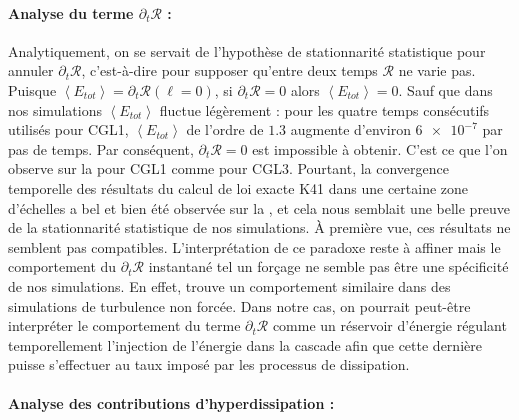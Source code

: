 \paragraph{Analyse du terme $\partial_t \mathcal{R}$ :  } 
 Analytiquement, on se servait de l'hypothèse de stationnarité statistique pour annuler $\partial_t \mathcal{R}$, c'est-à-dire pour supposer qu'entre deux temps $\mathcal{R}$ ne varie pas. Puisque $\left<E_{tot}\right>=\partial_t \mathcal{R}(\boldsymbol{\ell} = 0)$, si $\partial_t \mathcal{R}=0$ alors $\left<E_{tot}\right>=0$.  Sauf que dans nos simulations $\left<E_{tot}\right>$ fluctue légèrement : pour les quatre temps consécutifs utilisés pour CGL1, $\left<E_{tot}\right>$ de l'ordre de $\num{1.3}$ augmente d'environ $\num{6e-7}$ par pas de temps. Par conséquent, $\partial_t \mathcal{R}=0$ est impossible à obtenir. C'est ce que l'on observe sur la  pour CGL1 comme pour CGL3. Pourtant, la convergence temporelle des résultats du calcul de loi exacte K41 dans une certaine zone d'échelles a bel et bien été observée sur la , et cela nous semblait une belle preuve de la stationnarité statistique de nos simulations. À première vue, ces résultats ne semblent pas compatibles. L'interprétation de ce paradoxe reste à affiner mais le comportement du $\partial_t \mathcal{R}$ instantané tel un forçage ne semble pas être une spécificité de nos simulations. En effet, \cite{ferrand_-depth_2022} trouve un comportement similaire dans des simulations de turbulence non forcée. Dans notre cas, on pourrait peut-être interpréter le comportement du terme $\partial_t \mathcal{R}$ comme un réservoir d'énergie régulant temporellement l'injection de l'énergie dans la cascade afin que cette dernière puisse s'effectuer au taux imposé par les processus de dissipation. 

 \paragraph{Analyse des contributions d'hyperdissipation :  } 
 

